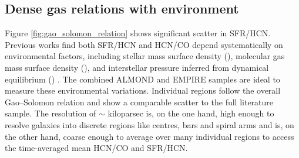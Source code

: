 \documentclass[letter, longauth]{aa} %
\begin{document}
\subsection{Dense gas relations with environment}
\label{sec:environment_relations}


Figure \ref{fig:gao_solomon_relation} shows significant scatter in SFR/HCN. Previous works find both SFR/HCN and HCN/CO depend systematically on environmental factors, including stellar mass surface density (\sigstar ), molecular gas mass surface density (\sigmol ), and interstellar pressure inferred from dynamical equilibrium (\pde ) \citep{Usero2015, Gallagher2018a, Jimenez-Donaire2019}. The combined ALMOND and EMPIRE samples are ideal to measure these environmental variations. 
Individual regions follow the overall Gao--Solomon relation and show a comparable scatter to the full literature sample. The resolution of $\sim$ kiloparsec is, on the one hand, high enough to resolve galaxies into discrete regions like centres, bars and spiral arms and is, on the other hand, coarse enough to average over many individual regions to access the time-averaged mean HCN/CO and SFR/HCN.
\end{document}
